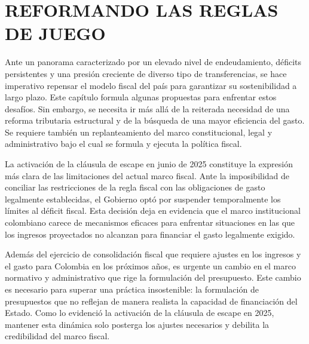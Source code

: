 \chapter{REFORMANDO LAS REGLAS DE JUEGO}\label{chap:normas}

Ante un panorama caracterizado por un elevado nivel de endeudamiento, déficits persistentes y una presión creciente de diverso tipo de transferencias, se hace imperativo repensar el modelo fiscal del país para garantizar su sostenibilidad a largo plazo. Este capítulo formula algunas propuestas para enfrentar estos desafíos. Sin embargo, se necesita ir más allá de la reiterada necesidad de una reforma tributaria estructural y de la búsqueda de una mayor eficiencia del gasto. Se requiere también un replanteamiento del marco constitucional, legal y administrativo bajo el cual se formula y ejecuta la política fiscal.

La activación de la cláusula de escape en junio de 2025 constituye la expresión más clara de las limitaciones del actual marco fiscal. Ante la imposibilidad de conciliar las restricciones de la regla fiscal con las obligaciones de gasto legalmente establecidas, el Gobierno optó por suspender temporalmente los límites al déficit fiscal. Esta decisión deja en evidencia que el marco institucional colombiano carece de mecanismos eficaces para enfrentar situaciones en las que los ingresos proyectados no alcanzan para financiar el gasto legalmente exigido.

Además del ejercicio de consolidación fiscal que requiere ajustes en los ingresos y el gasto para Colombia en los próximos años, es urgente un cambio en el marco normativo y administrativo que rige la formulación del presupuesto. Este cambio es necesario para superar una práctica insostenible: la formulación de presupuestos que no reflejan de manera realista la capacidad de financiación del Estado. Como lo evidenció la activación de la cláusula de escape en 2025, mantener esta dinámica solo posterga los ajustes necesarios y debilita la credibilidad del marco fiscal.

